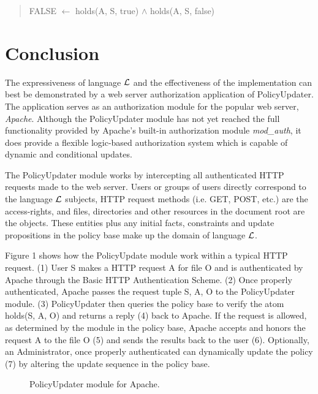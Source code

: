 \documentclass{llncs}
\begin{document}
        \begin{quote}
          FALSE $\leftarrow$ holds(A, S, true) $\land$ holds(A, S, false)
        \end{quote}

  \section{Conclusion}

    The expressiveness of language $\cal{L}$ and the effectiveness of the
    implementation can best be demonstrated by a web server authorization
    application of PolicyUpdater. The application serves as an authorization
    module for the popular web server, \emph{Apache}\footnotemark. Although the
    PolicyUpdater module has not yet reached the full functionality provided
    by Apache's built-in authorization module \emph{mod\_auth}, it does provide
    a flexible logic-based authorization system which is capable of dynamic and
    conditional updates.

    The PolicyUpdater module works by intercepting all authenticated HTTP
    requests made to the web server. Users or groups of users directly
    correspond to the language $\cal{L}$ subjects, HTTP request methods
    (i.e. GET, POST, etc.) are the access-rights, and files, directories
    and other resources in the document root are the objects. These entities
    plus any initial facts, constraints and update propositions in the 
    policy base make up the domain of language $\cal{L}$.

    Figure 1 shows how the PolicyUpdate module work within a typical HTTP
    request. (1) User S makes a HTTP request A for file O and is authenticated
    by Apache through the Basic HTTP Authentication Scheme. (2) Once properly
    authenticated, Apache passes the request tuple {S, A, O} to the
    PolicyUpdater module. (3) PolicyUpdater then queries the policy base 
    to verify the atom holds(S, A, O) and returns a reply (4) back to Apache.
    If the request is allowed, as determined by the module in the policy base,
    Apache accepts and honors the request A to the file O (5) and sends the
    results back to the user (6). Optionally, an Administrator, once properly
    authenticated can dynamically update the policy (7) by altering the
    update sequence in the policy base.


    \begin{figure}[h]
      \begin{center}
        \caption{PolicyUpdater module for Apache.}
      \end{center}
    \end{figure}
\end{document}
